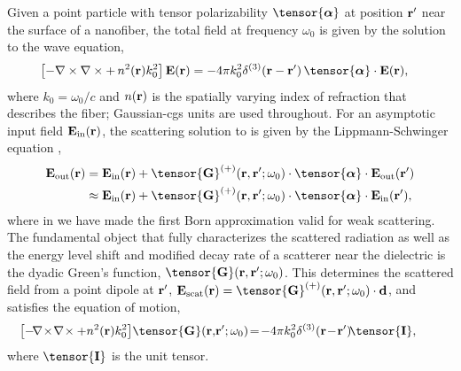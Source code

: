 \documentclass[aps,pra,twocolumn]{revtex4-1} %
\newcommand{\inp}{{\rm in}}
\newcommand{\out}{{\rm out}}
\newcommand{\unittens}{\tensor{\mathbf{I}}}
\begin{document}
Given a point particle with tensor polarizability $\tensor{\boldsymbol{\alpha}}$ at position $\mathbf{r}'$ near the surface of a nanofiber, the total field  at frequency $\omega_0$ is given by the solution to the wave equation, 
	\begin{align}\label{Eq::WaveEquationSource}
		\left[ - \nabla \times\nabla \times + \, n^2(\br)k_0^2 \right] \mathbf{E}(\br) &= -4\pi  k_0^2 \delta^{(3)}(\br-\br')\,  \tensor{\boldsymbol{\alpha}}\cdot \mathbf{E}(\br),
	\end{align}
where $k_0=\omega_0/c$ and $n(\mathbf{r})$ is the spatially varying index of refraction that describes the fiber; Gaussian-cgs units are used throughout.  
For an asymptotic input field $\mathbf{E}_{\inp}(\br)$, the scattering solution to  is given by the Lippmann-Schwinger equation \cite{wubs_multiple-scattering_2004},
	\begin{align}
		\mathbf{E}_{\out}(\br) &=\mathbf{E}_{\inp}(\br)+\tensor{\mathbf{G}}^{(+)}(\br , \br'; \omega_0)\cdot 
\tensor{\boldsymbol{\alpha}}\cdot \mathbf{E}_{\out}(\br')\\
		&\approx \mathbf{E}_{\inp}(\br)+ \tensor{\mathbf{G}}^{(+)}(\br , \br'; \omega_0) \cdot 
\tensor{\boldsymbol{\alpha}}\cdot \mathbf{E}_{\inp}(\br'), \label{Eq::ScatteredField}
	\end{align}
where in  we have made the first Born approximation valid for weak scattering. The fundamental object that fully characterizes the scattered radiation as well as the energy level shift and modified decay rate of a scatterer near the dielectric is the dyadic Green's function, $\tensor{\mathbf{G}}(\br, \br';\omega_0)$. This determines the scattered field from a point dipole at $\mathbf{r}'$, $\mathbf{E}_{\rm scat}(\br)= \tensor{\mathbf{G}}^{(+)}(\br , \br'; \omega_0)\cdot \mathbf{d}$, and satisfies the equation of motion,
	\begin{align} \label{Eq::GreensDiffEq}
		\!\!\!\!\!\!\left[ -\!\nabla\!\times\!\nabla\!\times + n^2(\mbf{r}) k_0^2 \right]\! \tensor{\mathbf{G}}(\br,\! \br';\omega_0) &\!=\! -4\pi 
k_0^2 \delta^{(3)}(\mathbf{r}\!-\!\mathbf{r}')\! \unittens,
	\end{align}
where $\unittens$ is the unit tensor.   
\end{document}

